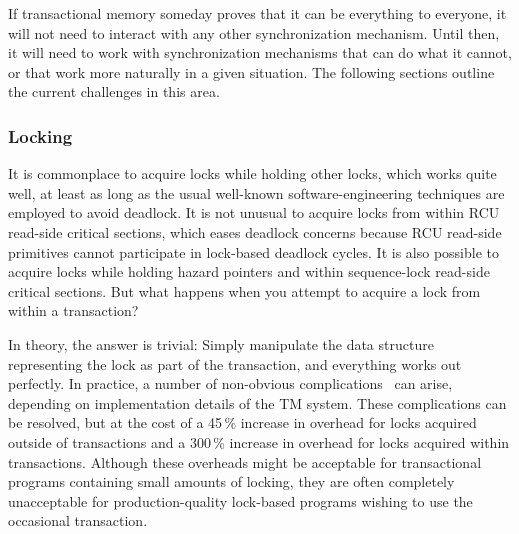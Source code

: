 If transactional memory someday proves that it can be everything to everyone,
it will not need to interact with any other synchronization mechanism.
Until then, it will need to work with synchronization mechanisms that
can do what it cannot, or that work more naturally in a given situation.
The following sections outline the current challenges in this area.

\subsubsection{Locking}
\label{sec:future:Locking}

It is commonplace to acquire locks while holding other locks, which works
quite well, at least as long as the usual well-known software-engineering
techniques are employed to avoid deadlock.
It is not unusual to acquire locks from within RCU read-side critical
sections, which eases deadlock concerns because RCU read-side primitives
cannot participate in lock-based deadlock cycles.
It is also possible to acquire locks while holding hazard pointers and
within sequence-lock read-side critical sections.
But what happens when you attempt to acquire a lock from within a transaction?

In theory, the answer is trivial:
Simply manipulate the data structure representing the lock as part of
the transaction, and everything works out perfectly.
In practice, a number of non-obvious complications~\cite{Volos2008TRANSACT}
can arise, depending on implementation details of the TM system.
These complications can be resolved, but at the cost of a 45\,\% increase in
overhead for locks acquired outside of transactions and a 300\,\% increase
in overhead for locks acquired within transactions.
Although these overheads might be acceptable for transactional
programs containing small amounts of locking, they are often completely
unacceptable for production-quality lock-based programs wishing to use
the occasional transaction.

